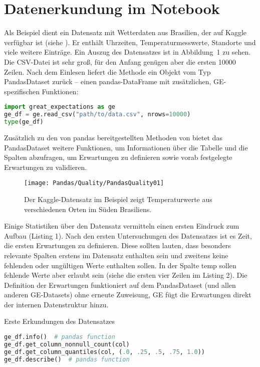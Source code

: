 \section{Datenerkundung im Notebook}
	
Als Beispiel dient ein Datensatz mit Wetterdaten aus Brasilien, der auf Kaggle verfügbar ist (siehe ). Er enthält Uhrzeiten, Temperaturmesswerte, Standorte und viele weitere Einträge. Ein  Auszug des Datensatzes ist in Abbildung 1 zu sehen. Die CSV-Datei ist sehr groß, für den Anfang genügen aber die ersten 10000 Zeilen. Nach dem Einlesen liefert die Methode  ein Objekt vom Typ    PandasDataset zurück -- einen pandas-DataFrame mit zusätzlichen, GE-spezifischen Funktionen:

\begin{lstlisting}[language=Python]
import great_expectations as ge
ge_df = ge.read_csv("path/to/data.csv", nrows=10000)
type(ge_df)
\end{lstlisting}	
	
Zusätzlich zu den von pandas bereitgestellten Methoden von  bietet das PandasDataset weitere Funktionen, um Informationen über die Tabelle und die Spalten abzufragen, um Erwartungen zu definieren sowie vorab festgelegte Erwartungen zu validieren.
	
\begin{figure}
	\texttt{[image: Pandas/Quality/PandasQuality01]}
	\caption{Der Kaggle-Datensatz im Beispiel zeigt Temperaturwerte aus verschiedenen Orten im Süden Brasiliens.}
\end{figure}	
	
	
	Einige Statistiken über den Datensatz vermitteln einen ersten Eindruck zum Aufbau (Listing 1). Nach den ersten Untersuchungen des Datensatzes ist es Zeit, die ersten Erwartungen zu definieren. Diese sollten lauten, dass besonders relevante Spalten erstens im Datensatz enthalten sein und zweitens keine fehlenden oder ungültigen Werte enthalten sollen. In der Spalte temp sollen fehlende Werte aber erlaubt sein (siehe die ersten vier Zeilen im Listing 2). Die Definition der Erwartungen funktioniert auf dem PandasDataset (und allen anderen GE-Datasets) ohne erneute Zuweisung, GE fügt die Erwartungen direkt der internen Datenstruktur hinzu.
	
\begin{code}	
  \caption{Erste Erkundungen des Datensatzes}
	
\begin{lstlisting}[language=Python]
ge_df.info()  # pandas function
ge_df.get_column_nonnull_count(col)
ge_df.get_column_quantiles(col, (.0, .25, .5, .75, 1.0))
ge_df.describe()  # pandas function
\end{lstlisting}
\end{code}	
	
